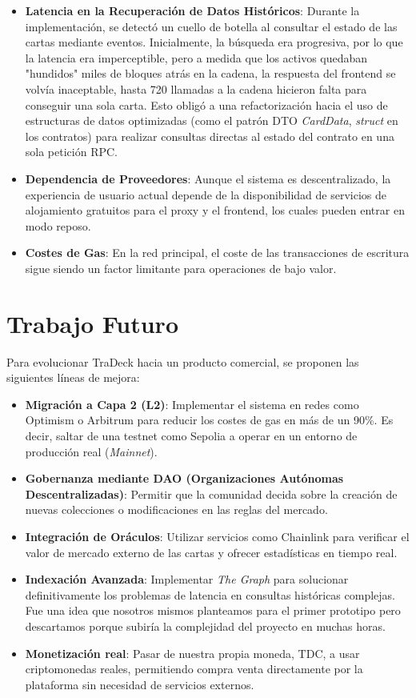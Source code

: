 \begin{itemize}
	\item \textbf{Latencia en la Recuperación de Datos Históricos}: Durante la implementación, se detectó un cuello de botella al 
	consultar el estado de las cartas mediante eventos. Inicialmente, la búsqueda era progresiva, por lo que la latencia era
	imperceptible, pero a medida que los activos quedaban "hundidos" miles de bloques atrás en la cadena, la respuesta 
	del frontend se volvía inaceptable, hasta 720 llamadas a la cadena hicieron falta para conseguir una sola carta. Esto obligó 
	a una refactorización hacia el uso de estructuras de datos optimizadas (como el patrón DTO \textit{CardData}, \textit{struct} 
	en los contratos) para realizar consultas directas al estado del contrato en una sola petición RPC.
	\item \textbf{Dependencia de Proveedores}: Aunque el sistema es descentralizado, la experiencia de usuario actual depende de la disponibilidad de servicios de alojamiento gratuitos para el proxy y el frontend, los cuales pueden entrar en modo reposo.
	\item \textbf{Costes de Gas}: En la red principal, el coste de las transacciones de escritura sigue siendo un factor limitante para operaciones de bajo valor.
\end{itemize}

\section{Trabajo Futuro}
Para evolucionar TraDeck hacia un producto comercial, se proponen las siguientes líneas de mejora:

\begin{itemize}
	\item \textbf{Migración a Capa 2 (L2)}: Implementar el sistema en redes como Optimism o Arbitrum para reducir 
	los costes de gas en más de un 90\%. Es decir, saltar de una testnet como Sepolia a operar en un entorno de producción real (\textit{Mainnet}).
	\item \textbf{Gobernanza mediante DAO (Organizaciones Autónomas Descentralizadas)}: Permitir que la comunidad decida sobre la creación de nuevas colecciones o modificaciones en las reglas del mercado.
	\item \textbf{Integración de Oráculos}: Utilizar servicios como Chainlink para verificar el valor de mercado externo de las cartas y ofrecer estadísticas en tiempo real.
	\item \textbf{Indexación Avanzada}: Implementar \textit{The Graph} para solucionar definitivamente los problemas de latencia en consultas históricas complejas. Fue una idea que nosotros mismos planteamos para el primer prototipo pero descartamos porque subiría la complejidad del proyecto en muchas horas.
	\item \textbf{Monetización real}: Pasar de nuestra propia moneda, TDC, a usar criptomonedas reales, permitiendo compra venta directamente por la plataforma sin necesidad de servicios externos.
\end{itemize}

